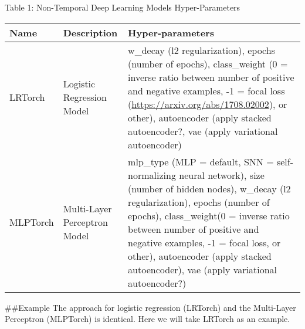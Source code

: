 \documentclass[
]{article}
\begin{document}
Table 1: Non-Temporal Deep Learning Models Hyper-Parameters

\begin{longtable}[]{@{}lll@{}}
\toprule
\begin{minipage}[b]{0.10\columnwidth}\raggedright
Name\strut
\end{minipage} & \begin{minipage}[b]{0.34\columnwidth}\raggedright
Description\strut
\end{minipage} & \begin{minipage}[b]{0.47\columnwidth}\raggedright
Hyper-parameters\strut
\end{minipage}\tabularnewline
\midrule
\endhead
\begin{minipage}[t]{0.10\columnwidth}\raggedright
LRTorch\strut
\end{minipage} & \begin{minipage}[t]{0.34\columnwidth}\raggedright
Logistic Regression Model\strut
\end{minipage} & \begin{minipage}[t]{0.47\columnwidth}\raggedright
w\_decay (l2 regularization), epochs (number of epochs), class\_weight
(0 = inverse ratio between number of positive and negative examples, -1
= focal loss (\url{https://arxiv.org/abs/1708.02002}), or other),
autoencoder (apply stacked autoencoder?, vae (apply variational
autoencoder)\strut
\end{minipage}\tabularnewline
\begin{minipage}[t]{0.10\columnwidth}\raggedright
MLPTorch\strut
\end{minipage} & \begin{minipage}[t]{0.34\columnwidth}\raggedright
Multi-Layer Perceptron Model\strut
\end{minipage} & \begin{minipage}[t]{0.47\columnwidth}\raggedright
mlp\_type (MLP = default, SNN = self-normalizing neural network), size
(number of hidden nodes), w\_decay (l2 regularization), epochs (number
of epochs), class\_weight(0 = inverse ratio between number of positive
and negative examples, -1 = focal loss, or other), autoencoder (apply
stacked autoencoder), vae (apply variational autoencoder?)\strut
\end{minipage}\tabularnewline
\bottomrule
\end{longtable}

\#\#Example The approach for logistic regression (LRTorch) and the
Multi-Layer Perceptron (MLPTorch) is identical. Here we will take
LRTorch as an example.
\end{document}
